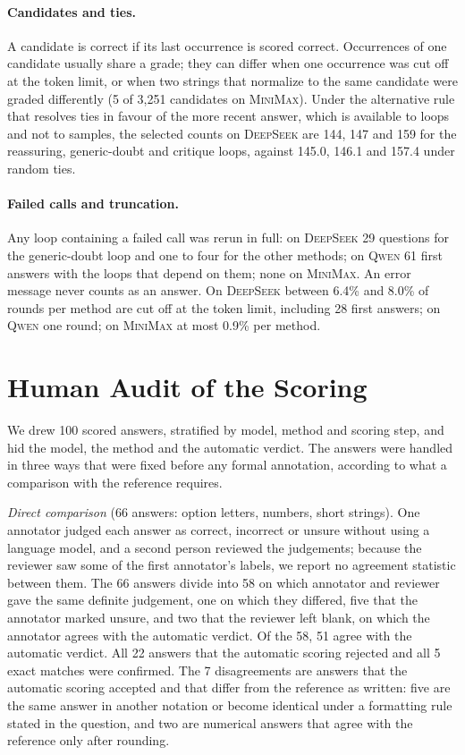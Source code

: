 \documentclass[11pt]{article}
\newcommand{\ds}{\textsc{DeepSeek}}
\newcommand{\qw}{\textsc{Qwen}}
\newcommand{\mm}{\textsc{MiniMax}}
\begin{document}
\paragraph{Candidates and ties.}
A candidate is correct if its last occurrence is scored correct.
Occurrences of one candidate usually share a grade; they can differ when one occurrence was cut off at the token limit, or when two strings that normalize to the same candidate were graded differently (5 of 3{,}251 candidates on \mm).
Under the alternative rule that resolves ties in favour of the more recent answer, which is available to loops and not to samples, the selected counts on \ds{} are 144, 147 and 159 for the reassuring, generic-doubt and critique loops, against 145.0, 146.1 and 157.4 under random ties.

\paragraph{Failed calls and truncation.}
Any loop containing a failed call was rerun in full: on \ds{} 29 questions for the generic-doubt loop and one to four for the other methods; on \qw{} 61 first answers with the loops that depend on them; none on \mm.
An error message never counts as an answer.
On \ds{} between 6.4\% and 8.0\% of rounds per method are cut off at the token limit, including 28 first answers; on \qw{} one round; on \mm{} at most 0.9\% per method.

\section{Human Audit of the Scoring}
\label{app:audit}

We drew 100 scored answers, stratified by model, method and scoring step, and hid the model, the method and the automatic verdict.
The answers were handled in three ways that were fixed before any formal annotation, according to what a comparison with the reference requires.

\emph{Direct comparison} (66 answers: option letters, numbers, short strings).
One annotator judged each answer as correct, incorrect or unsure without using a language model, and a second person reviewed the judgements; because the reviewer saw some of the first annotator's labels, we report no agreement statistic between them.
The 66 answers divide into 58 on which annotator and reviewer gave the same definite judgement, one on which they differed, five that the annotator marked unsure, and two that the reviewer left blank, on which the annotator agrees with the automatic verdict.
Of the 58, 51 agree with the automatic verdict.
All 22 answers that the automatic scoring rejected and all 5 exact matches were confirmed.
The 7 disagreements are answers that the automatic scoring accepted and that differ from the reference as written: five are the same answer in another notation or become identical under a formatting rule stated in the question, and two are numerical answers that agree with the reference only after rounding.
\end{document}
